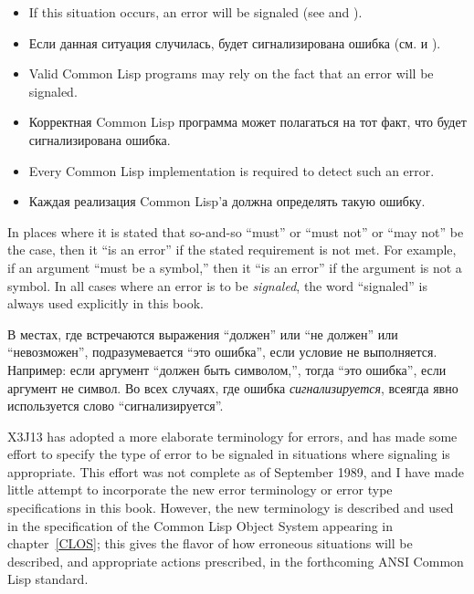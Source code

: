 \begin{itemize}
\item If this situation occurs, an error will be signaled
(see  and ).

\item Если данная ситуация случилась, будет сигнализирована ошибка
(см.  и ).

\item Valid Common Lisp programs may rely on the fact that an error will be
signaled.

\item Корректная Common Lisp программа может полагаться на тот факт, что будет
сигнализирована ошибка.

\item Every Common Lisp implementation is required to detect such an error.

\item Каждая реализация Common Lisp'а должна определять такую ошибку.
\end{itemize}

In places where it is stated that so-and-so ``must'' or ``must not''
or ``may not''  be the case, then it ``is an error'' if the stated requirement
is not met.  For example, if an argument ``must be a symbol,'' then it
``is an error'' if the argument is not a symbol.  In all cases where
an error is to be {\it signaled}, the word ``signaled'' is always used
explicitly in this book.

В местах, где встречаются выражения ``должен'' или ``не должен'' или
``невозможен'', подразумевается ``это ошибка'', если условие не
выполняется. Например: если аргумент ``должен быть символом,'', тогда ``это
ошибка'', если аргумент не символ. Во всех случаях, где ошибка {\it
сигнализируется}, всеягда явно используется слово ``сигнализируется''.

\begin{newer}
X3J13 has adopted a more elaborate terminology for errors,
and has made some effort to specify the type of error to be signaled
in situations where signaling is appropriate.  This effort
was not complete as of September 1989, and I have made little
attempt to incorporate the new error terminology or
error type specifications in this book.  However, the new terminology
is described and used in the specification of the
Common Lisp Object System appearing in chapter~\ref{CLOS}; this gives
the flavor of how erroneous situations will be described,
and appropriate actions prescribed, in the forthcoming ANSI Common
Lisp standard.
\end{newer}

